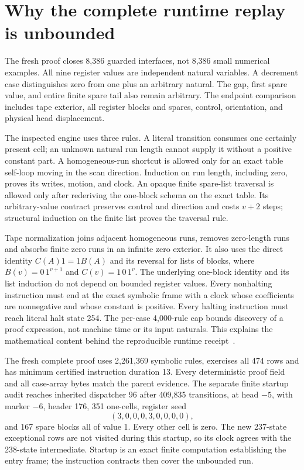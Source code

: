 \section{Why the complete runtime replay is unbounded}
\label{sec:runtime}

The fresh proof closes 8,386 guarded interfaces, not 8,386 small
numerical examples.  All nine register values are independent
natural variables.  A decrement case distinguishes zero from
one plus an arbitrary natural.  The gap, first spare value, and
entire finite spare tail also remain arbitrary.  The endpoint
comparison includes tape exterior, all register blocks and spares,
control, orientation, and physical head displacement.

The inspected engine uses three rules.  A literal transition consumes
one certainly present cell; an unknown natural run length cannot
supply it without a positive constant part.  A homogeneous-run
shortcut is allowed only for an exact table self-loop moving in
the scan direction.  Induction on run length, including zero,
proves its writes, motion, and clock.  An opaque finite spare-list
traversal is allowed only after rederiving the one-block schema on
the exact table.  Its arbitrary-value contract preserves control
and direction and costs $v+2$ steps; structural induction on the
finite list proves the traversal rule.

Tape normalization joins adjacent homogeneous runs, removes
zero-length runs and absorbs finite zero runs in an infinite zero
exterior.  It also uses the direct identity
$C(A)1=1B(A)$ and its reversal for lists of blocks, where
$B(v)=0\,1^{v+1}$ and $C(v)=1\,0\,1^v$.
The underlying one-block identity and its list induction do not
depend on bounded register values.  Every nonhalting instruction
must end at the exact symbolic frame with a clock whose coefficients
are nonnegative and whose constant is positive.  Every halting
instruction must reach literal halt state 254.  The per-case
4,000-rule cap bounds discovery of a proof expression, not machine
time or its input naturals.  This explains the mathematical content
behind the reproducible runtime receipt~\cite{parent237}.

The fresh complete proof uses 2,261,369 symbolic rules, exercises
all 474 rows and has minimum certified instruction duration 13.
Every deterministic proof field and all case-array bytes match
the parent evidence.  The separate finite startup audit reaches
inherited dispatcher 96 after 409,835 transitions, at head $-5$,
with marker $-6$, header 176, 351 one-cells, register seed
\[
                 (3,0,0,0,3,0,0,0,0),
\]
and 167 spare blocks all of value 1.  Every other cell is zero.
The new 237-state exceptional rows are not visited during this
startup, so its clock agrees with the 238-state intermediate.
Startup is an exact finite computation establishing the entry
frame; the instruction contracts then cover the unbounded run.

